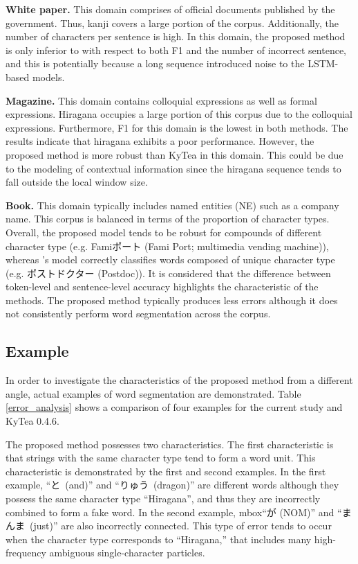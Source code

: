 \documentclass[11pt,letterpaper]{article}
\begin{document}
{\bf White paper.} This domain comprises of official documents published by the government. Thus, kanji covers a large portion of the corpus. Additionally, the number of characters per sentence is high. In this domain, the proposed method is only inferior to 
 with respect to both F1 and the number of incorrect sentence, and this is potentially because a long sequence introduced noise to the LSTM-based models. 

{\bf Magazine.} This domain contains colloquial expressions as well as formal expressions.
Hiragana occupies a large portion of this corpus due to the colloquial expressions. 
Furthermore, F1 for this domain is the lowest in both methods. 
The results indicate that hiragana exhibits a poor performance. However, the proposed method is more robust than KyTea in this domain. This could be due to the modeling of contextual information since the hiragana sequence tends to fall outside the local window size. 

{\bf  Book.}  This domain typically includes named entities (NE) such as a company name. This corpus is balanced in terms of the proportion of character types.
Overall, the proposed model tends to be robust for compounds of different character type (e.g. Famiポート (Fami Port; multimedia vending machine)), whereas
's model correctly classifies words composed of unique character type (e.g. ポストドクター (Postdoc)). It is considered that the difference between token-level and sentence-level accuracy highlights the characteristic of the methods. The proposed method typically produces less errors although it does not consistently perform word segmentation across the corpus.


\subsection{Example}
In order to investigate the characteristics of the proposed method from a different angle, actual examples of word segmentation are demonstrated. Table \ref {error_analysis} shows a comparison of four examples for the current study and KyTea 0.4.6.  


The proposed method possesses two characteristics. The first characteristic is that strings with the same character type tend to form a word unit. This characteristic is demonstrated by the first and second examples. 
In the first example, \mbox{``と (and)''} and \mbox{``りゅう (dragon)''} are different words although they possess the same character type ``Hiragana'', and thus they are incorrectly combined to form a fake word. In the second example, mbox{``が (NOM)'' }and \mbox{``まんま (just)''} are also incorrectly connected. This type of error tends to occur when the character type corresponds to \mbox{``Hiragana,''} that includes many high-frequency ambiguous single-character particles.
 
\end{document}
